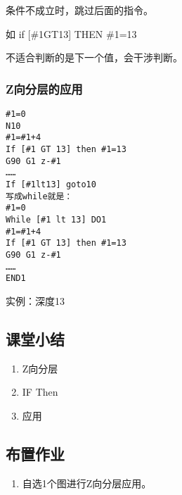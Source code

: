 条件不成立时，跳过后面的指令。

如 if [\#1GT13] THEN \#1=13

不适合判断的是下一个值，会干涉判断。


\subsubsection{Z向分层的应用}
\begin{verbatim}
#1=0
N10 
#1=#1+4
If [#1 GT 13] then #1=13
G90 G1 z-#1
……
If [#1lt13] goto10
写成while就是：
#1=0
While [#1 lt 13] DO1
#1=#1+4
If [#1 GT 13] then #1=13
G90 G1 z-#1
……
END1
\end{verbatim}

实例：深度13

\subsection{课堂小结}

\begin{enumerate}[1、]
	\item Z向分层
	\item IF Then
	\item 应用
\end{enumerate}

\vfill
\subsection{布置作业}
\begin{enumerate}[1、]
	\item 自选1个图进行Z向分层应用。 
\end{enumerate}
\vfill